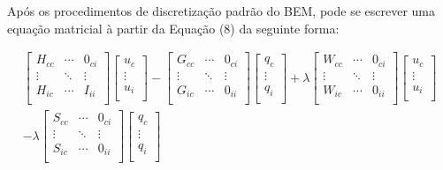\documentclass[a4paper,12p]{article}
\begin{document}
	Após os procedimentos de discretização padrão do BEM, pode se escrever uma equação matricial à partir da Equação (8) da seguinte forma:
	
	\begin{equation}
	\begin{gathered}
	\begin{bmatrix}
	H_{cc}  & \cdots  & 0_{ci} \\
	\vdots  & \ddots & \vdots \\
	H_{ic} & \cdots & I_{ii} \\
	\end{bmatrix}
	\begin{bmatrix}
	u_{c}\\
	\vdots\\
	u_{i}\\
	\end{bmatrix}
	-
	\begin{bmatrix}
	G_{cc}  & \cdots  & 0_{ci} \\
	\vdots  & \ddots & \vdots \\
	G_{ic} & \cdots & 0_{ii} \\
	\end{bmatrix}
	\begin{bmatrix}
	q_{c}\\
	\vdots\\
	q_{i}\\
	\end{bmatrix}
	+\lambda
	\begin{bmatrix}
	W_{cc}  & \cdots  & 0_{ci} \\
	\vdots  & \ddots & \vdots \\
	W_{ic} & \cdots & 0_{ii} \\
	\end{bmatrix}
	\begin{bmatrix}
	u_{c}\\
	\vdots\\
	u_{i}\\
	\end{bmatrix}
	\\
	-\lambda
	\begin{bmatrix}
	S_{cc}  & \cdots  & 0_{ci} \\
	\vdots  & \ddots & \vdots \\
	S_{ic} & \cdots & 0_{ii} \\
	\end{bmatrix}
	\begin{bmatrix}
	q_{c}\\
	\vdots\\
	q_{i}\\

\end{bmatrix}
\end{gathered}
\end{equation}
\end{document}
